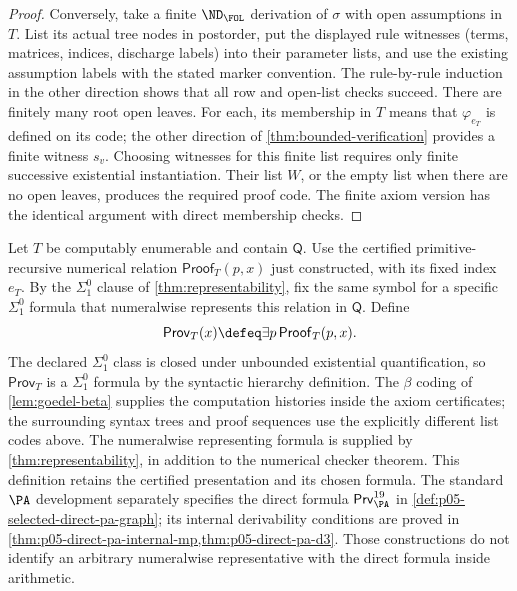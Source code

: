 \begin{proof}
Conversely, take a finite \(\ND_{\FOL}\) derivation of \(\sigma\)
with open assumptions in \(T\).  List its actual tree nodes in postorder,
put the displayed rule witnesses (terms, matrices, indices, discharge
labels) into their parameter lists, and use the existing assumption labels
with the stated marker convention.  The rule-by-rule induction in the
other direction shows that all row and open-list checks succeed.  There
are finitely many root open leaves.  For each, its membership in \(T\)
means that \(\varphi_{e_T}\) is defined on its code; the other direction
of \cref{thm:bounded-verification} provides a finite witness \(s_v\).
Choosing witnesses for this finite list requires only finite successive
existential instantiation.  Their list \(W\), or the empty list when
there are no open leaves, produces the required proof code.  The finite
axiom version has the identical argument with direct membership checks.
\end{proof}

\begin{definition}
\label{def:fixed-proof-predicate}
Let \(T\) be computably enumerable and contain \(\mathsf Q\).  Use the
certified primitive-recursive numerical relation \(\mathsf{Proof}_T(p,x)\)
just constructed, with its fixed index \(e_T\).  By the
\(\Sigma^0_1\) clause of \cref{thm:representability}, fix the same symbol
for a
specific \(\Sigma^0_1\) formula that numeralwise represents this relation in
\(\mathsf Q\).  Define
\[
  \mathsf{Prov}_T(x)\defeq\exists p\,\mathsf{Proof}_T(p,x).
\]
The declared \(\Sigma^0_1\) class is closed under unbounded existential
quantification, so \(\mathsf{Prov}_T\) is a \(\Sigma^0_1\) formula by
the syntactic hierarchy definition.  The
\(\beta\) coding of \cref{lem:goedel-beta} supplies the computation
histories inside the axiom certificates; the surrounding syntax trees
and proof sequences use the explicitly different list codes above.
The numeralwise representing formula is supplied by
\cref{thm:representability}, in addition to the numerical checker theorem.
This definition retains the certified presentation and its chosen formula.
The standard \(\PA\) development separately specifies the direct formula
\(\mathsf{Prv}^{19}_{\PA}\) in
\cref{def:p05-selected-direct-pa-graph}; its internal derivability
conditions are proved in
\cref{thm:p05-direct-pa-internal-mp,thm:p05-direct-pa-d3}.
Those constructions do not identify an arbitrary numeralwise representative
with the direct formula inside arithmetic.
\end{definition}

